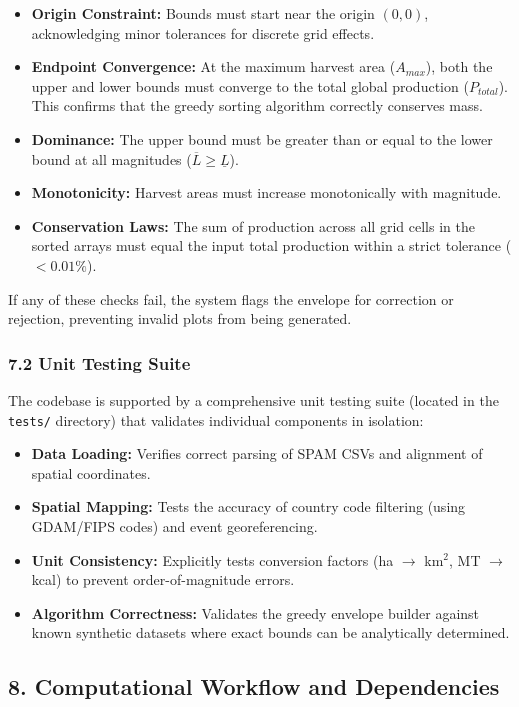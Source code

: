 \documentclass[11pt]{article}
\begin{document}
\begin{itemize}
    \item \textbf{Origin Constraint:} Bounds must start near the origin $(0,0)$, acknowledging minor tolerances for discrete grid effects.
    \item \textbf{Endpoint Convergence:} At the maximum harvest area ($A_{max}$), both the upper and lower bounds must converge to the total global production ($P_{total}$). This confirms that the greedy sorting algorithm correctly conserves mass.
    \item \textbf{Dominance:} The upper bound must be greater than or equal to the lower bound at all magnitudes ($\overline{L} \ge \underline{L}$).
    \item \textbf{Monotonicity:} Harvest areas must increase monotonically with magnitude.
    \item \textbf{Conservation Laws:} The sum of production across all grid cells in the sorted arrays must equal the input total production within a strict tolerance ($< 0.01\%$).
\end{itemize}

If any of these checks fail, the system flags the envelope for correction or rejection, preventing invalid plots from being generated.

\subsubsection*{7.2 Unit Testing Suite}

The codebase is supported by a comprehensive unit testing suite (located in the \texttt{tests/} directory) that validates individual components in isolation:
\begin{itemize}
    \item \textbf{Data Loading:} Verifies correct parsing of SPAM CSVs and alignment of spatial coordinates.
    \item \textbf{Spatial Mapping:} Tests the accuracy of country code filtering (using GDAM/FIPS codes) and event georeferencing.
    \item \textbf{Unit Consistency:} Explicitly tests conversion factors (ha $\to$ km$^2$, MT $\to$ kcal) to prevent order-of-magnitude errors.
    \item \textbf{Algorithm Correctness:} Validates the greedy envelope builder against known synthetic datasets where exact bounds can be analytically determined.
\end{itemize}

\subsection*{8. Computational Workflow and Dependencies}
\end{document}
